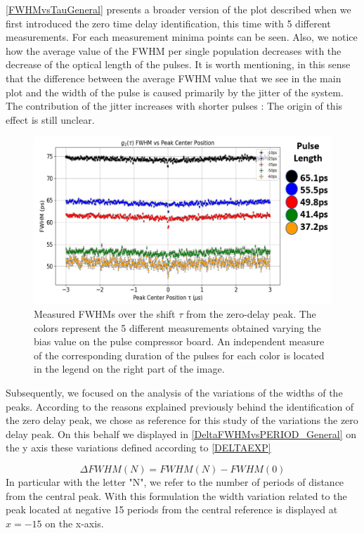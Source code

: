 \autoref{FWHMvsTauGeneral} presents a broader version of the plot described when we first introduced the zero time delay identification, this time with 5 different measurements. For each measurement minima points can be seen. 
Also, we notice how the average value of the FWHM per single population decreases with the decrease of the optical length of the pulses. It is worth mentioning, in this sense that the difference between the average FWHM value that we see in the main plot and the width of the pulse is caused primarily by the jitter of the system.
The contribution of the jitter increases with shorter pulses : The origin of this effect is still unclear.

\begin{figure}[hbtp]
\centering
\includegraphics[width=1\textwidth]{FWHMvsTAU_ALL_Version2.jpg}
\caption{Measured FWHMs over the shift $\tau$ from the zero-delay peak. The colors represent the 5 different measurements obtained varying the bias value on the pulse compressor board. An independent measure of the corresponding duration of the pulses for each color is located in the legend on the right part of the image. }
\label{FWHMvsTauGeneral}
\end{figure}

Subsequently, we focused on the analysis of the variations of the widths of the peaks. According to the reasons explained previously behind the identification of the zero delay peak, we chose as reference for this study of the variations the zero delay peak.
On this behalf we displayed in \autoref{DeltaFWHMvsPERIOD_General} on the y axis these variations defined according to \autoref{DELTAEXP}

\begin{equation}
\Delta FWHM (N) = FWHM(N) - FWHM(0) 
\label{DELTAEXP}
\end{equation}
In particular with the letter "N", we refer to the number of periods of distance from the central peak. With this formulation the width variation related to the peak located at negative 15 periods from the central reference is displayed at  $x = -15$ on the x-axis.


